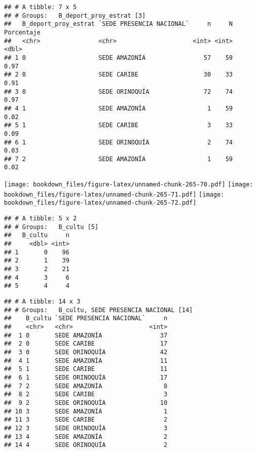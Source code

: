 \documentclass[]{article}
\theoremstyle{definition}
\theoremstyle{definition}
\theoremstyle{definition}
\theoremstyle{remark}
\begin{document}
\begin{verbatim}
## # A tibble: 7 x 5
## # Groups:   B_deport_proy_estrat [3]
##   B_deport_proy_estrat `SEDE PRESENCIA NACIONAL`     n     N Porcentaje
##   <chr>                <chr>                     <int> <int>      <dbl>
## 1 0                    SEDE AMAZONÍA                57    59       0.97
## 2 0                    SEDE CARIBE                  30    33       0.91
## 3 0                    SEDE ORINOQUÍA               72    74       0.97
## 4 1                    SEDE AMAZONÍA                 1    59       0.02
## 5 1                    SEDE CARIBE                   3    33       0.09
## 6 1                    SEDE ORINOQUÍA                2    74       0.03
## 7 2                    SEDE AMAZONÍA                 1    59       0.02
\end{verbatim}

\texttt{[image: bookdown\_files/figure-latex/unnamed-chunk-265-70.pdf]}
\texttt{[image: bookdown\_files/figure-latex/unnamed-chunk-265-71.pdf]}
\texttt{[image: bookdown\_files/figure-latex/unnamed-chunk-265-72.pdf]}

\begin{verbatim}
## # A tibble: 5 x 2
## # Groups:   B_cultu [5]
##   B_cultu     n
##     <dbl> <int>
## 1       0    96
## 2       1    39
## 3       2    21
## 4       3     6
## 5       4     4
\end{verbatim}

\begin{verbatim}
## # A tibble: 14 x 3
## # Groups:   B_cultu, SEDE PRESENCIA NACIONAL [14]
##    B_cultu `SEDE PRESENCIA NACIONAL`     n
##    <chr>   <chr>                     <int>
##  1 0       SEDE AMAZONÍA                37
##  2 0       SEDE CARIBE                  17
##  3 0       SEDE ORINOQUÍA               42
##  4 1       SEDE AMAZONÍA                11
##  5 1       SEDE CARIBE                  11
##  6 1       SEDE ORINOQUÍA               17
##  7 2       SEDE AMAZONÍA                 8
##  8 2       SEDE CARIBE                   3
##  9 2       SEDE ORINOQUÍA               10
## 10 3       SEDE AMAZONÍA                 1
## 11 3       SEDE CARIBE                   2
## 12 3       SEDE ORINOQUÍA                3
## 13 4       SEDE AMAZONÍA                 2
## 14 4       SEDE ORINOQUÍA                2
\end{verbatim}
\end{document}
